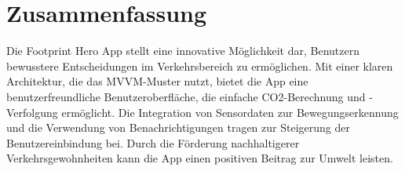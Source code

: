 \documentclass{article}
\begin{document}
\section{Zusammenfassung}

Die Footprint Hero App stellt eine innovative Möglichkeit dar, Benutzern bewusstere Entscheidungen im Verkehrsbereich zu ermöglichen. Mit einer klaren Architektur, die das MVVM-Muster nutzt, bietet die App eine benutzerfreundliche Benutzeroberfläche, die einfache CO2-Berechnung und -Verfolgung ermöglicht. Die Integration von Sensordaten zur Bewegungserkennung und die Verwendung von Benachrichtigungen tragen zur Steigerung der Benutzereinbindung bei. Durch die Förderung nachhaltigerer Verkehrsgewohnheiten kann die App einen positiven Beitrag zur Umwelt leisten.
\end{document}
